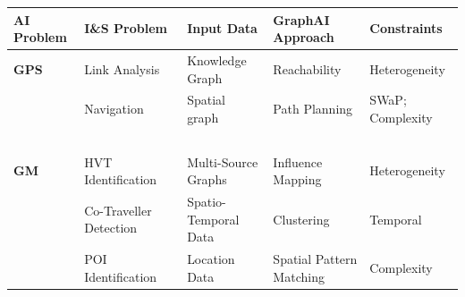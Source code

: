     
    \begin{table}[t]
        \begin{center}
            {\scriptsize
            \begin{tabular}{lllll} 
                \ac{AI} Problem                                  & I\&S Problem                        & Input Data                       &  GraphAI Approach                 &   Constraints         \\
                \hline
                \textbf{\acs{GPS}}                                & Link Analysis~\cite{Xu2004}         & Knowledge Graph                   & Reachability             & Heterogeneity   \\
                                                            & Navigation                          & Spatial graph                     & Path Planning            & SWaP; Complexity      \\
                        ~                                   &                    ~                &                 ~                 &             ~                 &          ~            \\
                \textbf{\acs{GM}}                                 & HVT Identification                  & Multi-Source Graphs               & Influence Mapping        & Heterogeneity         \\
                                                            & Co-Traveller Detection~\cite{Sawas2019,Tritsarolis2021,Regli2022a,Tang2014,Wang2016a}              & Spatio-Temporal Data               & Clustering            & Temporal   \\
                                                            & POI Identification~\cite{Osullivan2023,Osullivan2023a}                  & Location Data                     & Spatial Pattern Matching & Complexity \\
                

\end{tabular}}
\end{center}
\end{table}
